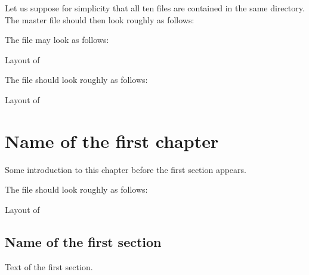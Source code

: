 Let us suppose for simplicity that all ten files are contained in the same directory.
The master file  should then look roughly as follows:
%
%
The file  may look as follows:
%
\begin{showcode}{Layout of }

\usepackage{mathtools}
\usepackage{amssymb}

\usepackage{tikz-cd}


\DeclareMathOperator{\End}{End}
\DeclareMathOperator{\Hom}{Hom}
\end{showcode}
%
The file  should look roughly as follows:
%
\begin{showcode}{Layout of }
\chapter{Name of the first chapter}

Some introduction to this chapter before the first section appears.



\end{showcode}
%
The file  should look roughly as follows:
%
\begin{showcode}{Layout of }
\section{Name of the first section}

Text of the first section.
\end{showcode}



